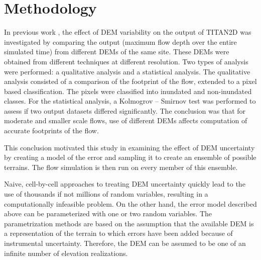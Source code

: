 \documentclass[12pt]{article}
\begin{document}
\section{Methodology}

In previous work \citep{stefanescu1}, the effect of DEM variability on
the output of TITAN2D %
was investigated by comparing the output (maximum flow depth over the
entire simulated time) from different DEMs of the same site.  These
DEMs were obtained from different techniques at different
resolution. Two types of analysis were performed: a qualitative
analysis and a statistical analysis. The qualitative analysis
consisted of a comparison of the footprint of the flow, extended to a
pixel based classification. The pixels were classified into inundated
and non-inundated classes. For the statistical analysis, a
Kolmogrov -- Smirnov test was performed to assess if two output datasets differed
significantly. The conclusion was that for moderate and smaller scale
flows, use of different DEMs affects computation of accurate
footprints of the flow.

This conclusion motivated this study in examining the effect of DEM
uncertainty by creating a model of the error and sampling it to create
an ensemble of possible terrains.  The flow simulation is then run on
every member of this ensemble.

Naive, cell-by-cell approaches to treating DEM uncertainty quickly
lead to the use of thousands if not millions of random variables,
resulting in a computationally infeasible problem.  On the other hand,
the error model described above can be parameterized with one or two
random variables.  The parametrization methods are based on the
assumption that the available DEM is a representation of the terrain
to which errors have been added because of instrumental uncertainty.
Therefore, the DEM can be assumed to be one of an infinite number of
elevation realizations.
\end{document}
